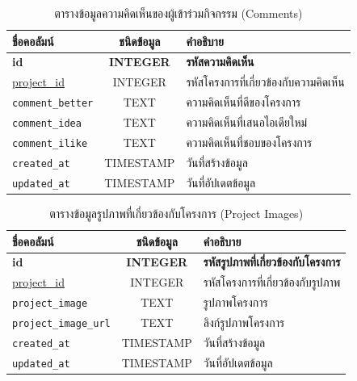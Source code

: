 \begin{table}[h]
    \centering
    \begin{tabular}{|l|c|l|}
        \hline
        ชื่อคอลัมน์                 & ชนิดข้อมูล          & คำอธิบาย                        \\ \hline
        \textbf{id}             & \textbf{INTEGER} & \textbf{รหัสความคิดเห็น}         \\ \hline
        \underline{project\_id} & INTEGER          & รหัสโครงการที่เกี่ยวข้องกับความคิดเห็น \\ \hline
        \verb |comment_better|  & TEXT             & ความคิดเห็นที่ดีของโครงการ         \\ \hline
        \verb |comment_idea|    & TEXT             & ความคิดเห็นที่เสนอไอเดียใหม่        \\ \hline
        \verb |comment_ilike|   & TEXT             & ความคิดเห็นที่ชอบของโครงการ       \\ \hline
        \verb |created_at|      & TIMESTAMP        & วันที่สร้างข้อมูล                   \\ \hline
        \verb |updated_at|      & TIMESTAMP        & วันที่อัปเดตข้อมูล                  \\ \hline
    \end{tabular}
    \caption{ตารางข้อมูลความคิดเห็นของผู้เข้าร่วมกิจกรรม (Comments)}
    \label{tab:comment_data}
\end{table}

\begin{table}[h]
    \centering
    \begin{tabular}{|l|c|l|}
        \hline
        ชื่อคอลัมน์                   & ชนิดข้อมูล          & คำอธิบาย                             \\ \hline
        \textbf{id}               & \textbf{INTEGER} & \textbf{รหัสรูปภาพที่เกี่ยวข้องกับโครงการ} \\ \hline
        \underline{project\_id}   & INTEGER          & รหัสโครงการที่เกี่ยวข้องกับรูปภาพ          \\ \hline
        \verb |project_image|     & TEXT             & รูปภาพโครงการ                       \\ \hline
        \verb |project_image_url| & TEXT             & ลิงก์รูปภาพโครงการ                    \\ \hline
        \verb |created_at|        & TIMESTAMP        & วันที่สร้างข้อมูล                        \\ \hline
        \verb |updated_at|        & TIMESTAMP        & วันที่อัปเดตข้อมูล                       \\ \hline
    \end{tabular}
    \caption{ตารางข้อมูลรูปภาพที่เกี่ยวข้องกับโครงการ (Project Images)}
    \label{tab:project_images_data}
\end{table}

